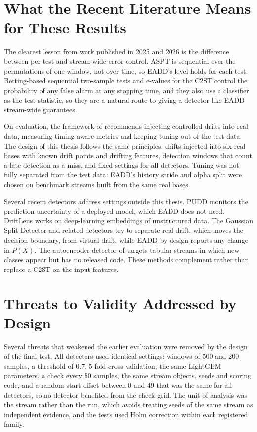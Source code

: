 \section{What the Recent Literature Means for These Results}
\label{sec:disc-literature}

The clearest lesson from work published in 2025 and 2026 is the difference between per-test and stream-wide error control. ASPT is sequential over the permutations of one window, not over time, so EADD's level holds for each test. Betting-based sequential two-sample tests \citep{PodkopaevRamdas2023} and e-values for the C2ST \citep{EC2ST2024} control the probability of any false alarm at any stopping time, and they also use a classifier as the test statistic, so they are a natural route to giving a detector like EADD stream-wide guarantees.

On evaluation, the framework of \citet{CerqueiraKDD2026} recommends injecting controlled drifts into real data, measuring timing-aware metrics and keeping tuning out of the test data. The design of this thesis follows the same principles: drifts injected into six real bases with known drift points and drifting features, detection windows that count a late detection as a miss, and fixed settings for all detectors. Tuning was not fully separated from the test data: EADD's history stride and alpha split were chosen on benchmark streams built from the same real bases.

Several recent detectors address settings outside this thesis. PUDD \citep{PUDD2025} monitors the prediction uncertainty of a deployed model, which EADD does not need. DriftLens \citep{DriftLens2024} works on deep-learning embeddings of unstructured data. The Gaussian Split Detector \citep{GaussianSplit2024} and related detectors try to separate real drift, which moves the decision boundary, from virtual drift, while EADD by design reports any change in $P(X)$. The autoencoder detector of \citet{Komorniczak2026} targets tabular streams in which new classes appear but has no released code. These methods complement rather than replace a C2ST on the input features.

\section{Threats to Validity Addressed by Design}
\label{sec:disc-validity}

Several threats that weakened the earlier evaluation were removed by the design of the final test. All detectors used identical settings: windows of 500 and 200 samples, a threshold of 0.7, 5-fold cross-validation, the same LightGBM parameters, a check every 50 samples, the same stream objects, seeds and scoring code, and a random start offset between 0 and 49 that was the same for all detectors, so no detector benefited from the check grid. The unit of analysis was the stream rather than the run, which avoids treating seeds of the same stream as independent evidence, and the tests used Holm correction within each registered family.

